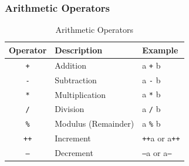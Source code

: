 \documentclass[xcolor=dvipsnames]{beamer}
\begin{document}
    \begin{frame}
        \frametitle{Arithmetic Operators}
        \begin{table}[h]
        \centering
        \caption{Arithmetic Operators}
        \begin{tabular}{cll}
        \toprule
        \textbf{Operator} & \textbf{Description} & \textbf{Example} \\
         \midrule
            \texttt{+}  & Addition & a \texttt{+} b \\
            \texttt{-}  & Subtraction & a \texttt{-} b \\
            \texttt{*}  & Multiplication & a \texttt{*} b \\
            \texttt{/}  & Division & a \texttt{/} b \\
            \texttt{\%}  & Modulus (Remainder) & a \texttt{\%} b \\
            \texttt{++} & Increment & \texttt{++}a or a\texttt{++} \\
            \texttt{--} & Decrement & \texttt{--}a or a\texttt{--} \\
        \bottomrule
        \end{tabular}
        \end{table}
    \end{frame}
\end{document}
